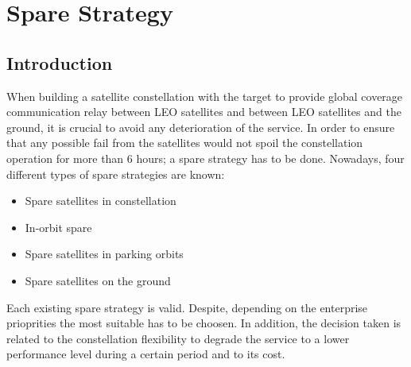 \section{Spare Strategy}
\subsection{Introduction}
When building a satellite constellation with the target to provide global coverage communication relay between LEO satellites and between LEO satellites and the ground, it is crucial to avoid any deterioration of the service. In order to ensure that any possible fail from the satellites would not spoil the constellation operation for more than 6 hours; a spare strategy has to be done. Nowadays, four different types of spare strategies are known:
\begin{itemize} 

\item {Spare satellites in constellation}
\item {In-orbit spare} 
\item {Spare satellites in parking orbits} 
\item {Spare satellites on the ground} 

\end{itemize}
Each existing spare strategy is valid. Despite, depending on the enterprise prioprities the most suitable has to be choosen. In addition, the decision taken is related to the constellation flexibility to degrade the service to a lower performance level during a certain period and to its cost. 

